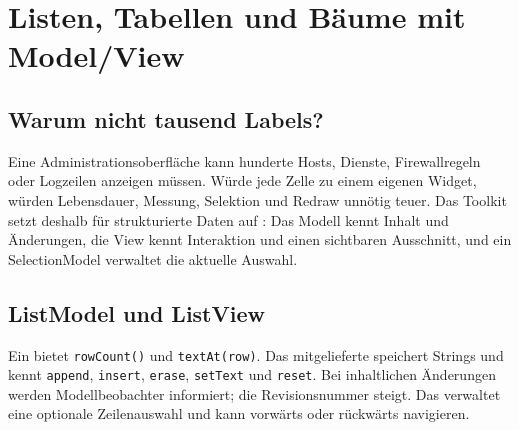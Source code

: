 \chapter{Listen, Tabellen und Bäume mit Model/View}\label{chap:models}

\section{Warum nicht tausend Labels?}
Eine Administrationsoberfläche kann hunderte Hosts, Dienste,
Firewallregeln oder Logzeilen anzeigen müssen.
Würde jede Zelle zu einem eigenen Widget, würden
Lebensdauer, Messung, Selektion und Redraw unnötig teuer.
Das Toolkit setzt deshalb für strukturierte Daten auf
: Das Modell kennt Inhalt und Änderungen,
die View kennt Interaktion und einen sichtbaren Ausschnitt,
und ein SelectionModel verwaltet die aktuelle Auswahl.

\begin{center}
\end{center}

\section{ListModel und ListView}
Ein  bietet \texttt{rowCount()}
und \texttt{textAt(row)}. Das mitgelieferte
 speichert Strings und
kennt \texttt{append}, \texttt{insert}, \texttt{erase},
\texttt{setText} und \texttt{reset}.
Bei inhaltlichen Änderungen werden
Modellbeobachter informiert; die Revisionsnummer
steigt. Das  verwaltet
eine optionale Zeilenauswahl und kann vorwärts
oder rückwärts navigieren.

